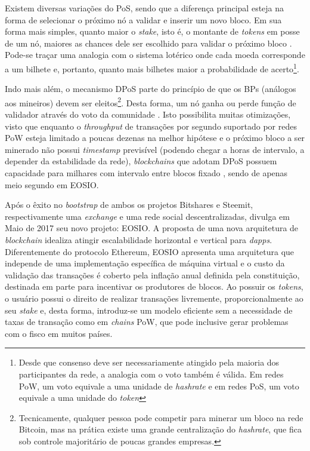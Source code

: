 \documentclass[a4paper,12pt]{monografia}
\theoremstyle{plain}
\theoremstyle{definition}
\theoremstyle{remark}
\begin{document}
Existem diversas varia\c{c}\~oes do PoS, sendo que a diferen\c{c}a principal esteja na forma de selecionar o pr\'oximo n\'o a validar e inserir um novo bloco.
Em sua forma mais simples, quanto maior o \textit{stake}, isto \'e, o montante de \textit{tokens} em posse de um n\'o, maiores as chances dele ser escolhido para validar o pr\'oximo bloco \cite{pos}.
Pode-se tra\c{c}ar uma analogia com o sistema lot\'{e}rico onde cada moeda corresponde a um bilhete e, portanto, quanto mais bilhetes maior a probabilidade de acerto\footnote{Desde que consenso deve ser necessariamente atingido pela maioria dos participantes da rede, a analogia com o voto tamb\'em \'e v\'alida. Em redes PoW, um voto equivale a uma unidade de \textit{hashrate} e em redes PoS, um voto equivale a uma unidade do \textit{token}}.

Indo mais al\'em, o mecanismo DPoS parte do princ\'ipio de que os BPs (an\'{a}logos aos mineiros) devem ser eleitos\footnote{Tecnicamente, qualquer pessoa pode competir para minerar um bloco na rede Bitcoin, mas na pr\'atica existe uma grande centraliza\c{c}\~ao do \textit{hashrate}, que fica sob controle majorit\'ario de poucas grandes empresas.}.
Desta forma, um n\'o ganha ou perde fun\c{c}\~ao de validador atrav\'es do voto da comunidade \cite{dpos}.
Isto possibilita muitas otimiza\c{c}\~oes, visto que enquanto o \textit{throughput} de transa\c{c}\~oes por segundo suportado por redes PoW esteja limitado a poucas dezenas na melhor hip\'otese e o pr\'oximo bloco a ser minerado n\~ao possui \textit{timestamp} previs\'ivel (podendo chegar a horas de intervalo, a depender da estabilidade da rede), \textit{blockchains} que adotam DPoS possuem capacidade para milhares com intervalo entre blocos fixado \cite{bitshares}, sendo de apenas meio segundo em EOSIO.

Ap\'os o \^exito no \textit{bootstrap} de ambos os projetos Bitshares e Steemit, respectivamente uma \textit{exchange} e uma rede social descentralizadas,  divulga em Maio de 2017 seu novo projeto: EOSIO.
A proposta de uma nova arquitetura de \textit{blockchain} idealiza atingir escalabilidade horizontal e vertical para \textit{dapps}.
Diferentemente do protocolo Ethereum, EOSIO apresenta uma arquitetura que independe de uma implementa\c{c}\~{a}o espec\'{i}fica de m\'{a}quina virtual e o custo da valida\c{c}\~ao das transa\c{c}\~oes \'{e} coberto pela infla\c{c}\~{a}o anual definida pela constitui\c{c}\~{a}o, destinada em parte para incentivar os produtores de blocos.
Ao possuir os \textit{tokens}, o usu\'{a}rio possui o direito de realizar transa\c{c}\~{o}es livremente, proporcionalmente ao seu \textit{stake} e, desta forma, introduz-se um modelo eficiente sem a necessidade de taxas de transa\c{c}\~{a}o como em \textit{chains} PoW, que pode inclusive gerar problemas com o fisco em muitos pa\'{i}ses.
\end{document}
